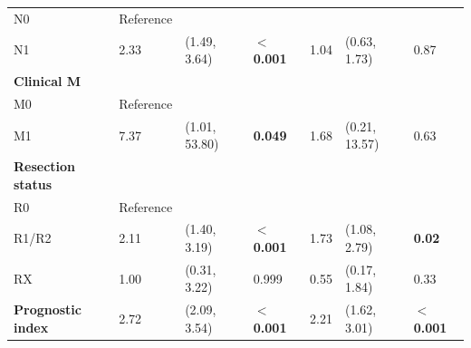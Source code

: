 \documentclass[twocolumn]{bmcart}%
\begin{document}
\begin{table}[ht!]
\begin{tabular}{lllllll}
\\
\hspace{1mm} N0 & Reference & & & 
\\
\hspace{1mm} N1 & 2.33 & (1.49, 3.64) & \textbf{$<$0.001} & 1.04 & (0.63, 1.73) & 0.87 
\\
\textbf{Clinical M} & & & &
\\
\hspace{1mm} M0 & Reference & & &
\\
\hspace{1mm} M1 & 7.37 & (1.01, 53.80) & \textbf{0.049} & 1.68 & (0.21, 13.57) & 0.63
\\
\textbf{Resection status} & & & & 
\\
\hspace{1mm} R0 & Reference & & & 
\\
\hspace{1mm} R1/R2 & 2.11 & (1.40, 3.19) & \textbf{$<$0.001} & 1.73 & (1.08, 2.79) & \textbf{0.02} 
\\
\hspace{1mm} RX & 1.00 & (0.31, 3.22) & 0.999 & 0.55 & (0.17, 1.84) & 0.33 
\\
\textbf{Prognostic index} & 2.72 & (2.09, 3.54) & \textbf{$<$0.001} & 2.21 & (1.62, 3.01) & \textbf{$<$0.001} 
\\
\toprule
\end{tabular}
\label{tab:clinical_univ}
\end{table}
\end{document}
